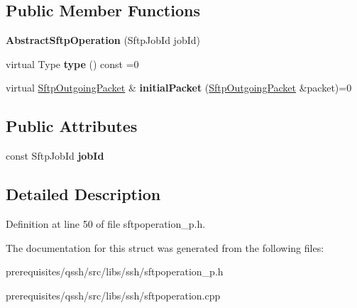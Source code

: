 \subsection*{Public Member Functions}
\begin{DoxyCompactItemize}
\item 
\mbox{\label{struct_q_ssh_1_1_internal_1_1_abstract_sftp_operation_a42fa42524aa2e37bb64d7309888fbed7}} 
{\bfseries Abstract\+Sftp\+Operation} (Sftp\+Job\+Id job\+Id)
\item 
\mbox{\label{struct_q_ssh_1_1_internal_1_1_abstract_sftp_operation_a0f44f5b5c95b179f4167450d1738afa9}} 
virtual Type {\bfseries type} () const =0
\item 
\mbox{\label{struct_q_ssh_1_1_internal_1_1_abstract_sftp_operation_a72d1f87d171711b648fe6267842722e1}} 
virtual \mbox{\hyperlink{class_q_ssh_1_1_internal_1_1_sftp_outgoing_packet}{Sftp\+Outgoing\+Packet}} \& {\bfseries initial\+Packet} (\mbox{\hyperlink{class_q_ssh_1_1_internal_1_1_sftp_outgoing_packet}{Sftp\+Outgoing\+Packet}} \&packet)=0
\end{DoxyCompactItemize}
\subsection*{Public Attributes}
\begin{DoxyCompactItemize}
\item 
\mbox{\label{struct_q_ssh_1_1_internal_1_1_abstract_sftp_operation_a602063a3c164e0902e8f93d31dfb19af}} 
const Sftp\+Job\+Id {\bfseries job\+Id}
\end{DoxyCompactItemize}


\subsection{Detailed Description}


Definition at line 50 of file sftpoperation\+\_\+p.\+h.



The documentation for this struct was generated from the following files\+:\begin{DoxyCompactItemize}
\item 
prerequisites/qssh/src/libs/ssh/sftpoperation\+\_\+p.\+h\item 
prerequisites/qssh/src/libs/ssh/sftpoperation.\+cpp\end{DoxyCompactItemize}
